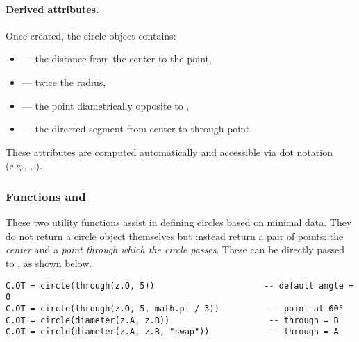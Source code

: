 \paragraph{Derived attributes.}
Once created, the circle object contains:
\begin{itemize}
\item {} — the distance from the center to the point,
\item {} — twice the radius,
\item {} — the point diametrically opposite to ,
\item {} — the directed segment from center to through point.
\end{itemize}
These attributes are computed automatically and accessible via dot notation (e.g., , ).


\vspace{1em}

\begin{tkzexample}[latex=.5\textwidth]
\begin{center}
  \end{center}
\end{tkzexample}

\subsubsection{Functions  and } %
\label{ssub:function_code_through_and_code_diameter}

These two utility functions assist in defining circles based on minimal data. They do not return a circle object themselves but instead return a pair of points: the \emph{center} and a \emph{point through which the circle passes}. These can be directly passed to , as shown below.

\begin{mybox}
\begin{verbatim}
C.OT = circle(through(z.O, 5))                      -- default angle = 0
C.OT = circle(through(z.O, 5, math.pi / 3))          -- point at 60°
C.OT = circle(diameter(z.A, z.B))                    -- through = B
C.OT = circle(diameter(z.A, z.B, "swap"))            -- through = A
\end{verbatim}
\end{mybox}


